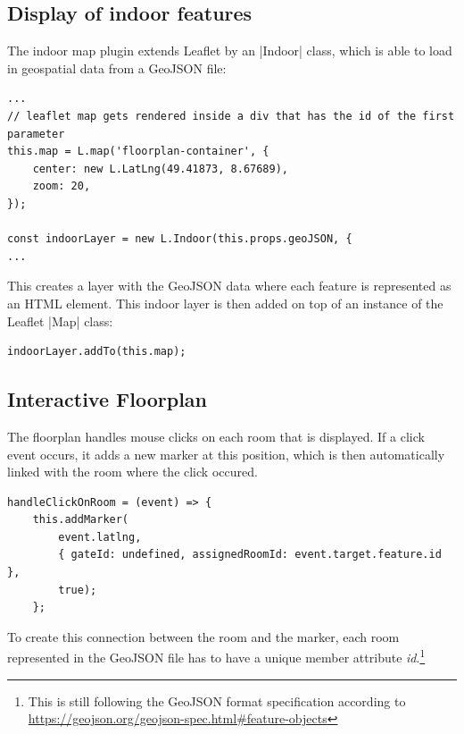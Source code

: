 \subsection{Display of indoor features}
\label{Display of indoor features}

The indoor map plugin extends Leaflet by an |Indoor| class, which is able to load in geospatial data from a GeoJSON file:

\begin{lstlisting}[label=setupMap]
...
// leaflet map gets rendered inside a div that has the id of the first parameter
this.map = L.map('floorplan-container', {
	center: new L.LatLng(49.41873, 8.67689),
	zoom: 20,
});

const indoorLayer = new L.Indoor(this.props.geoJSON, {
...
\end{lstlisting}

This creates a layer with the GeoJSON data where each feature is represented as an HTML element.
This indoor layer is then added on top of an instance of the  Leaflet |Map|\cite{leaflet:map} class:

\begin{lstlisting}[label=addIndoorLayerToMap]
indoorLayer.addTo(this.map);
\end{lstlisting}



\subsection{Interactive Floorplan}
\label{Interactive Floorplan}

The floorplan handles mouse clicks on each room that is displayed. If a click event occurs, it adds a new marker at this position, which is then automatically linked with the room where the click occured.

\begin{lstlisting}[label=addMarkers]
handleClickOnRoom = (event) => {
	this.addMarker(
		event.latlng, 
		{ gateId: undefined, assignedRoomId: event.target.feature.id }, 
		true);
	};
\end{lstlisting}

To create this connection between the room and the marker, each room represented in the GeoJSON file has to have a unique member attribute \emph{id}.\footnote{This is still following the GeoJSON format specification according to \url{https://geojson.org/geojson-spec.html\#feature-objects}}

